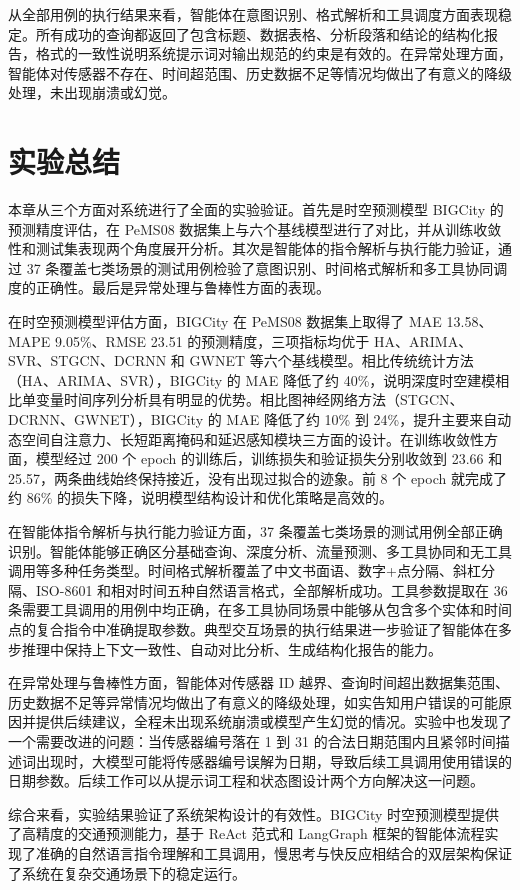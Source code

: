 从全部用例的执行结果来看，智能体在意图识别、格式解析和工具调度方面表现稳定。所有成功的查询都返回了包含标题、数据表格、分析段落和结论的结构化报告，格式的一致性说明系统提示词对输出规范的约束是有效的。在异常处理方面，智能体对传感器不存在、时间超范围、历史数据不足等情况均做出了有意义的降级处理，未出现崩溃或幻觉。

\section{实验总结}

本章从三个方面对系统进行了全面的实验验证。首先是时空预测模型 BIGCity 的预测精度评估，在 PeMS08 数据集上与六个基线模型进行了对比，并从训练收敛性和测试集表现两个角度展开分析。其次是智能体的指令解析与执行能力验证，通过 37 条覆盖七类场景的测试用例检验了意图识别、时间格式解析和多工具协同调度的正确性。最后是异常处理与鲁棒性方面的表现。

在时空预测模型评估方面，BIGCity 在 PeMS08 数据集上取得了 MAE 13.58、MAPE 9.05\%、RMSE 23.51 的预测精度，三项指标均优于 HA、ARIMA、SVR、STGCN、DCRNN 和 GWNET 等六个基线模型。相比传统统计方法（HA、ARIMA、SVR），BIGCity 的 MAE 降低了约 40\%，说明深度时空建模相比单变量时间序列分析具有明显的优势。相比图神经网络方法（STGCN、DCRNN、GWNET），BIGCity 的 MAE 降低了约 10\% 到 24\%，提升主要来自动态空间自注意力、长短距离掩码和延迟感知模块三方面的设计。在训练收敛性方面，模型经过 200 个 epoch 的训练后，训练损失和验证损失分别收敛到 23.66 和 25.57，两条曲线始终保持接近，没有出现过拟合的迹象。前 8 个 epoch 就完成了约 86\% 的损失下降，说明模型结构设计和优化策略是高效的。

在智能体指令解析与执行能力验证方面，37 条覆盖七类场景的测试用例全部正确识别。智能体能够正确区分基础查询、深度分析、流量预测、多工具协同和无工具调用等多种任务类型。时间格式解析覆盖了中文书面语、数字+点分隔、斜杠分隔、ISO-8601 和相对时间五种自然语言格式，全部解析成功。工具参数提取在 36 条需要工具调用的用例中均正确，在多工具协同场景中能够从包含多个实体和时间点的复合指令中准确提取参数。典型交互场景的执行结果进一步验证了智能体在多步推理中保持上下文一致性、自动对比分析、生成结构化报告的能力。

在异常处理与鲁棒性方面，智能体对传感器 ID 越界、查询时间超出数据集范围、历史数据不足等异常情况均做出了有意义的降级处理，如实告知用户错误的可能原因并提供后续建议，全程未出现系统崩溃或模型产生幻觉的情况。实验中也发现了一个需要改进的问题：当传感器编号落在 1 到 31 的合法日期范围内且紧邻时间描述词出现时，大模型可能将传感器编号误解为日期，导致后续工具调用使用错误的日期参数。后续工作可以从提示词工程和状态图设计两个方向解决这一问题。

综合来看，实验结果验证了系统架构设计的有效性。BIGCity 时空预测模型提供了高精度的交通预测能力，基于 ReAct 范式和 LangGraph 框架的智能体流程实现了准确的自然语言指令理解和工具调用，慢思考与快反应相结合的双层架构保证了系统在复杂交通场景下的稳定运行。